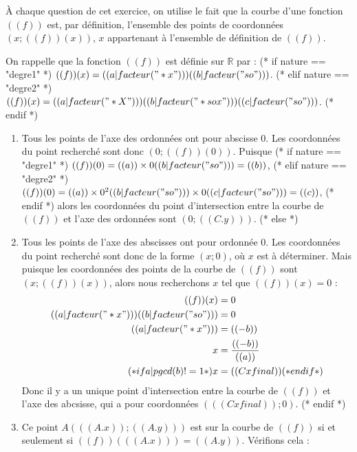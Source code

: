 \exercice*

À chaque question de cet exercice, on utilise le fait que la courbe d'une fonction $(( f ))$ est, par définition, l'ensemble des points de coordonnées $\left(x; (( f ))(x)\right)$, $x$ appartenant à l'ensemble de définition de $(( f ))$.

On rappelle que la fonction $((f))$ est définie sur $\mathbb{R}$ par :
(* if nature ==  "degre1" *)
$(( f ))(x) = (( a|facteur("*x") ))(( b|facteur("so") ))$.
(* elif nature ==  "degre2" *)
$(( f ))(x) = (( a|facteur("*X") ))(( b|facteur("*sox") ))(( c|facteur("so") ))$.
(* endif *)

\begin{enumerate}
  (* if sens ==  "antecedent-vers-image" *)
    \item Tous les points de l'axe des ordonnées ont pour abscisse 0. Les coordonnées du point recherché sont donc $\left(0; (( f ))(0)\right)$. Puisque 
        (* if nature ==  "degre1" *)
        $(( f ))(0)=(( a ))\times0 (( b|facteur("so") ))=(( b ))$,
        (* elif nature ==  "degre2" *)
        $(( f ))(0)=(( a ))\times0^2 (( b|facteur("so") ))\times0 (( c|facteur("so") ))=(( c ))$,
        (* endif *)
        alors les coordonnées du point d'intersection entre la courbe de $(( f ))$ et l'axe des ordonnées sont $\left( 0; (( C.y ))\right)$.
  (* else *)
  \item Tous les points de l'axe des abscisses ont pour ordonnée 0. Les coordonnées du point recherché sont donc de la forme $\left( x; 0 \right)$, où $x$ est à déterminer. Mais puisque les coordonnées des points de la courbe de $(( f ))$ sont $\left( x;(( f ))(x) \right)$, alors nous recherchons $x$ tel que $(( f ))(x)=0$ :
    \begin{align*}
        (( f ))(x) &= 0 \\
        (( a|facteur("*x") )) (( b|facteur("so") )) &= 0\\
        (( a|facteur("*x") )) &= (( -b )) \\
        x &= \frac{(( -b ))}{((a))} \\
        (* if a|pgcd(b) != 1 *)
        x &= (( Cxfinal ))
        (* endif *)
    \end{align*}
    Donc il y a un unique point d'intersection entre la courbe de $(( f ))$ et l'axe des abcsisse, qui a pour coordonnées $\left( ((Cxfinal));0 \right)$.
  (* endif *)
\item Ce point $A( ((A.x)) ; ((A.y)) )$ est sur la courbe de $(( f ))$ si et seulement si $(( f ))( ((A.x)) )=((A.y))$. Vérifions cela :

\end{enumerate}
